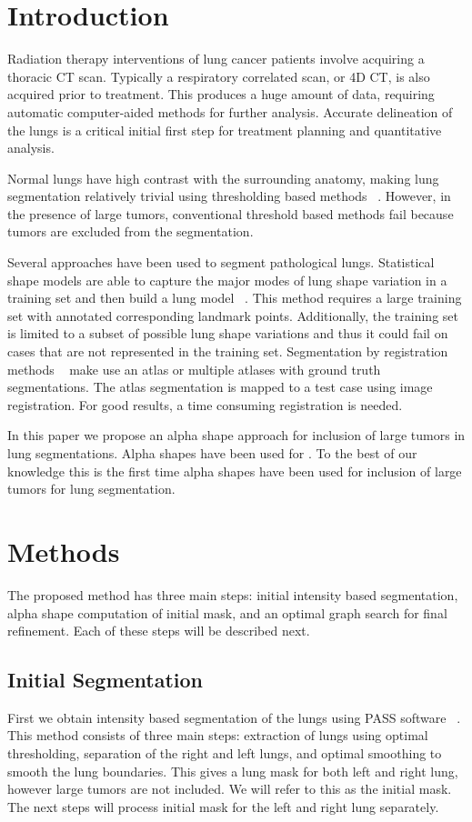 \documentclass{llncs}
\begin{document}
\section{Introduction}
%
Radiation therapy interventions of lung cancer patients involve acquiring a thoracic CT scan. Typically a respiratory correlated scan, or 4D CT, is also acquired prior to treatment. This produces a huge amount of data, requiring automatic computer-aided methods for further analysis. Accurate delineation of the lungs is a critical initial first step for treatment planning and quantitative analysis.

Normal lungs have high contrast with the surrounding anatomy, making lung segmentation relatively trivial using thresholding based methods ~\cite{guo2008,hu2001}. However, in the presence of large tumors, conventional threshold based methods fail because tumors are excluded from the segmentation. 

Several approaches have been used to segment pathological lungs. Statistical shape models are able to capture the major modes of lung shape variation in a training set and then build a lung model ~\cite{sun2012,sofka2011}. This method requires a large training set with annotated corresponding landmark points. Additionally, the training set is limited to a subset of possible lung shape variations and thus it could fail on cases that are not represented in the training set. Segmentation by registration methods ~\cite{sluimer2005,vanrikxoort2009} make use an atlas or multiple atlases with ground truth segmentations. The atlas segmentation is mapped to a test case using image registration. For good results, a time consuming registration is needed.

In this paper we propose an alpha shape approach for inclusion of large tumors in lung segmentations. Alpha shapes have been used for . To the best of our knowledge this is the first time alpha shapes have been used for inclusion of large tumors for lung segmentation. 


%
\section{Methods}
%
The proposed method has three main steps: initial intensity based segmentation, alpha shape computation of initial mask, and an optimal graph search for final refinement. Each of these steps will be described next.
%
\subsection{Initial Segmentation}
%
First we obtain intensity based segmentation of the lungs using PASS software ~\cite{guo2008}. This method consists of three main steps: extraction of lungs using optimal thresholding, separation of the right and left lungs, and optimal smoothing to smooth the lung boundaries. This gives a lung mask for both left and right lung, however large tumors are not included. We will refer to this as the initial mask. The next steps will process initial mask for the left and right lung separately. 
%
\end{document}
